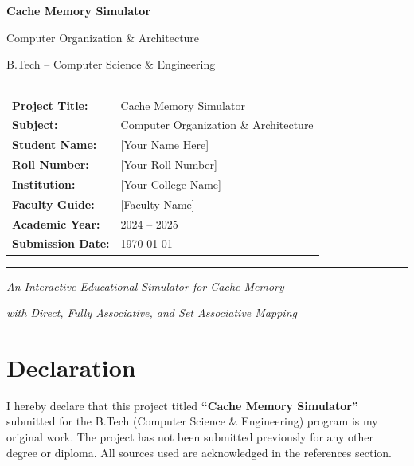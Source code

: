 \documentclass[12pt,a4paper]{report}
\begin{document}

\begin{titlepage}
\centering
\vspace*{1cm}
{\Huge\bfseries\color{primary} Cache Memory Simulator\par}
\vspace{0.5cm}
{\Large\color{secondary} Computer Organization \& Architecture\par}
\vspace{0.3cm}
{\large B.Tech -- Computer Science \& Engineering\par}
\vspace{2cm}
\hrule\vspace{0.4cm}
\begin{tabular}{ll}
\textbf{Project Title:}  & Cache Memory Simulator \\[6pt]
\textbf{Subject:}        & Computer Organization \& Architecture \\[6pt]
\textbf{Student Name:}   & [Your Name Here] \\[6pt]
\textbf{Roll Number:}    & [Your Roll Number] \\[6pt]
\textbf{Institution:}    & [Your College Name] \\[6pt]
\textbf{Faculty Guide:}  & [Faculty Name] \\[6pt]
\textbf{Academic Year:}  & 2024 -- 2025 \\[6pt]
\textbf{Submission Date:}& \today \\
\end{tabular}
\vspace{0.4cm}\hrule
\vfill
{\large\itshape An Interactive Educational Simulator for Cache Memory\par}
{\large\itshape with Direct, Fully Associative, and Set Associative Mapping\par}
\end{titlepage}

\chapter*{Declaration}
I hereby declare that this project titled \textbf{``Cache Memory Simulator''} submitted
for the B.Tech (Computer Science \& Engineering) program is my original work.
The project has not been submitted previously for any other degree or diploma.
All sources used are acknowledged in the references section.
\end{document}
